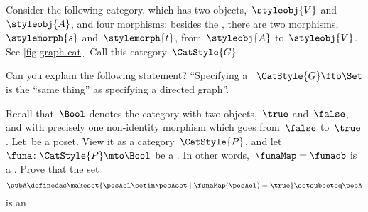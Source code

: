 \begin{marginfigure}
    \centering
    \caption{}
    \label{fig:graph-cat}
\end{marginfigure}

\begin{gradedexercise}
    \label{ex:GraphsViaFunctors}
    Consider the following category, which has two objects,~$\styleobj{V}$ and~$\styleobj{A}$, and four morphisms: besides the , there are two morphisms,~$\stylemorph{s}$ and~$\stylemorph{t}$, from~$\styleobj{A}$ to~$\styleobj{V}$.
    See \cref{fig:graph-cat}.
    Call this category~$\CatStyle{G}$.

    Can you explain the following statement?
    ``Specifying a ~$\CatStyle{G} \fto \Set$ is the ``same thing'' as specifying a directed graph''.
\end{gradedexercise}


\begin{gradedexercise}
    \label{ex:UpperSetsViaFunctors}
    Recall that~$\Bool$ denotes the category with two objects,~$\true$ and~$\false$, and with precisely one non-identity morphism which goes from~$\false$ to~$\true$.
    Let~\posA be a poset.
    View it as a category~$\CatStyle{P}$, and let~$\funa \colon \CatStyle{P} \mto \Bool$ be a .
    In other words,~$\funaMap = \funaob$ is a .
    Prove that the set
    \begin{equation}
        \subA \definedas \makeset{ \posAel \setin \posAset \mid \funaMap(\posAel) = \true } \setsubseteq \posA
    \end{equation}
    is an .
\end{gradedexercise}

